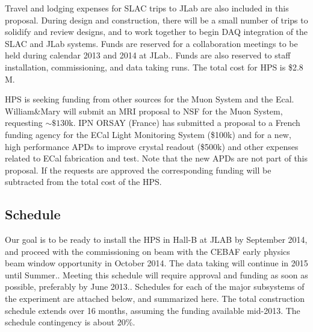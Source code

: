 Travel and lodging expenses for SLAC trips to JLab are also included in this proposal. During design and construction, there will be a small number of trips to solidify and review designs, and to work together to begin DAQ integration of the SLAC and JLab systems. Funds are reserved for a collaboration meetings to be held during calendar 2013 and 2014 at JLab.. Funds are also reserved  to staff installation, commissioning, and data taking runs. The total cost for HPS is \$2.8 M. 

HPS is seeking funding from other sources for the Muon System and the Ecal.
William\&Mary will submit an MRI proposal to NSF for the Muon System, requesting $\sim \$130$k. IPN ORSAY (France) has submitted a proposal to a French funding agency for the ECal Light Monitoring System (\$100k) and for a new, high performance APDs to improve crystal readout (\$500k) and other expenses related to ECal fabrication and test. Note that the new APDs are not part of this proposal. If the requests are approved the corresponding funding will be subtracted from the total cost of the HPS. 

\subsection{Schedule}

Our goal is to be ready to install the HPS in Hall-B at JLAB  by September 2014, and proceed with the commissioning on beam with the CEBAF early physics beam window opportunity in October 2014. The data taking will continue in 2015 until Summer.. Meeting this schedule  will require approval and funding as soon as possible, preferably by June 2013.. Schedules for each of the major subsystems of the experiment are attached below, and summarized here. The total construction schedule extends over  16 months, assuming the funding available mid-2013. The schedule contingency is about 20\%. 

